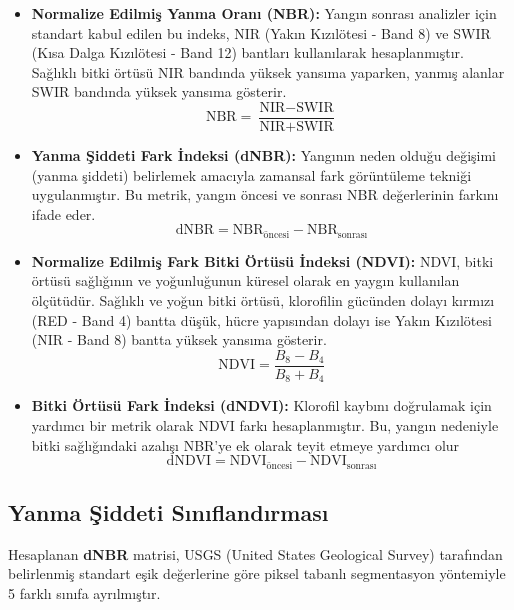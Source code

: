 \documentclass[11pt,a4paper]{article}
\begin{document}
\begin{itemize}
    \item \textbf{Normalize Edilmiş Yanma Oranı (NBR):} Yangın sonrası analizler için standart kabul edilen bu indeks, NIR (Yakın Kızılötesi - Band 8) ve SWIR (Kısa Dalga Kızılötesi - Band 12) bantları kullanılarak hesaplanmıştır. Sağlıklı bitki örtüsü NIR bandında yüksek yansıma yaparken, yanmış alanlar SWIR bandında yüksek yansıma gösterir.
    \begin{equation}
        \label{eq:nbr}
        \text{NBR} = \frac{\text{NIR} - \text{SWIR}}{\text{NIR} + \text{SWIR}}
    \end{equation}

    \item \textbf{Yanma Şiddeti Fark İndeksi (dNBR):} Yangının neden olduğu değişimi (yanma şiddeti) belirlemek amacıyla zamansal fark görüntüleme tekniği uygulanmıştır. Bu metrik, yangın öncesi ve sonrası NBR değerlerinin farkını ifade eder.
    \begin{equation}
        \label{eq:dnbr}
        \text{dNBR} = \text{NBR}_{\text{öncesi}} - \text{NBR}_{\text{sonrası}}
    \end{equation}

    \item \textbf{Normalize Edilmiş Fark Bitki Örtüsü İndeksi (NDVI):} NDVI, bitki örtüsü sağlığının ve yoğunluğunun küresel olarak en yaygın kullanılan ölçütüdür. Sağlıklı ve yoğun bitki örtüsü, klorofilin gücünden dolayı kırmızı (RED - Band 4) bantta düşük, hücre yapısından dolayı ise Yakın Kızılötesi (NIR - Band 8) bantta yüksek yansıma gösterir.
    \begin{equation}
        \label{eq:ndvi}
        \text{NDVI} = \frac{B_8 - B_4}{B_8 + B_4}
    \end{equation}
    
    \item \textbf{Bitki Örtüsü Fark İndeksi (dNDVI):} Klorofil kaybını doğrulamak için yardımcı bir metrik olarak NDVI farkı hesaplanmıştır. Bu, yangın nedeniyle bitki sağlığındaki azalışı NBR'ye ek olarak teyit etmeye yardımcı olur
    \begin{equation}
        \label{eq:dndvi}
        \text{dNDVI} = \text{NDVI}_{\text{öncesi}} - \text{NDVI}_{\text{sonrası}}
    \end{equation}

\end{itemize}


\subsection{Yanma Şiddeti Sınıflandırması}
Hesaplanan \textbf{dNBR} matrisi, USGS (United States Geological Survey) tarafından belirlenmiş standart eşik değerlerine göre piksel tabanlı segmentasyon yöntemiyle 5 farklı sınıfa ayrılmıştır.
\end{document}
